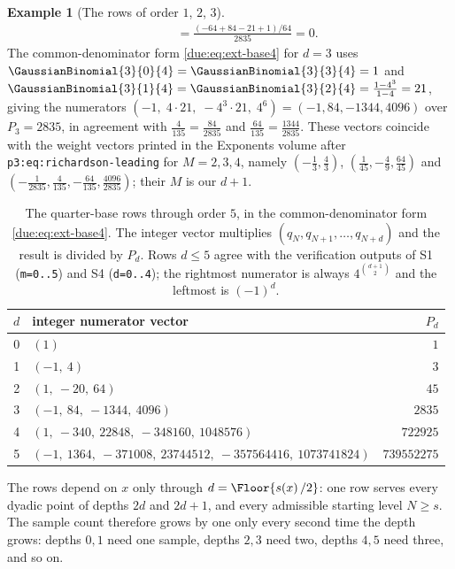\documentclass[11pt,oneside]{article}
\theoremstyle{plain}
\theoremstyle{definition}
\newtheorem{example}[theorem]{Example}
\theoremstyle{remark}
\newcommand{\upn}[1]{\RvachevUp_{#1}}
\newcommand{\dep}[1]{s\!\left(#1\right)}                    %
\newcommand{\qn}[1]{q_{#1}}                                 %
\begin{document}
\begin{example}[The rows of order $1$, $2$, $3$]
\begin{align*}
 &\qquad
 =\frac{(-64+84-21+1)/64}{2835}=0.
\end{align*}
The common-denominator form \cref{due:eq:ext-base4} for $d=3$ uses
$\GaussianBinomial{3}{0}{4}=\GaussianBinomial{3}{3}{4}=1$ and
$\GaussianBinomial{3}{1}{4}=\GaussianBinomial{3}{2}{4}=\tfrac{1-4^{3}}{1-4}=21$,
giving the numerators $(-1,\;4\cdot21,\;-4^{3}\cdot21,\;4^{6})
=(-1,84,-1344,4096)$ over $P_{3}=2835$, in agreement with
$\tfrac{4}{135}=\tfrac{84}{2835}$ and $\tfrac{64}{135}=\tfrac{1344}{2835}$.
These vectors coincide with the weight vectors printed in the Exponents volume
\cite{proveit-exponents} after \texttt{p3:eq:richardson-\allowbreak leading} for
$M=2,3,4$, namely $(-\tfrac13,\tfrac43)$,
$(\tfrac1{45},-\tfrac49,\tfrac{64}{45})$ and
$(-\tfrac1{2835},\tfrac4{135},-\tfrac{64}{135},\tfrac{4096}{2835})$; their
$M$ is our $d+1$.
\end{example}

\begin{table}[htbp]
\centering
\caption{The quarter-base rows through order $5$, in the common-denominator
form \cref{due:eq:ext-base4}.  The integer vector multiplies
$(\qn{N},\qn{N+1},\ldots,\qn{N+d})$ and the result is divided by $P_{d}$.
Rows $d\le5$ agree with the verification outputs of S1 (\texttt{m=0..5}) and
S4 (\texttt{d=0..4}); the rightmost numerator is always $4^{\binom{d+1}{2}}$
and the leftmost is $(-1)^{d}$.}
\label{due:tab:ext-rows}
\begin{tabular}{c@{\qquad}l@{\qquad}r}
\toprule
$d$ & integer numerator vector & $P_{d}$\\
\midrule
0 & $(1)$ & $1$\\
1 & $(-1,\ 4)$ & $3$\\
2 & $(1,\ -20,\ 64)$ & $45$\\
3 & $(-1,\ 84,\ -1344,\ 4096)$ & $2835$\\
4 & $(1,\ -340,\ 22848,\ -348160,\ 1048576)$ & $722925$\\
5 & $(-1,\ 1364,\ -371008,\ 23744512,\ -357564416,\ 1073741824)$ & $739552275$\\
\bottomrule
\end{tabular}
\end{table}

The rows depend on $x$ only through $d=\Floor{\dep{x}/2}$: one row serves
every dyadic point of depths $2d$ and $2d+1$, and every admissible starting
level $N\ge s$.  The sample count therefore grows by one only every second
time the depth grows: depths $0,1$ need one sample, depths $2,3$ need two,
depths $4,5$ need three, and so on.
\end{document}
